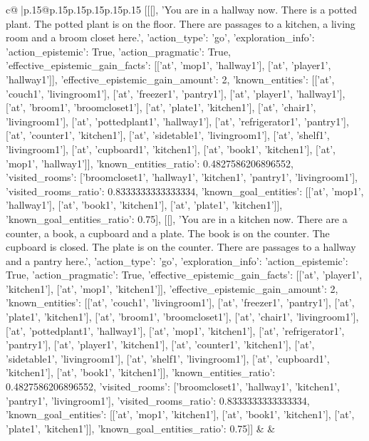 \documentclass{article}
\begin{document}
{\begin{supertabular}{c@{$\;$}|p{.15\linewidth}@{}p{.15\linewidth}p{.15\linewidth}p{.15\linewidth}p{.15\linewidth}p{.15\linewidth}}
{{{	 [[[], 'You are in a hallway now. There is a potted plant. The potted plant is on the floor. There are passages to a kitchen, a living room and a broom closet here.', {'action_type': 'go', 'exploration_info': {'action_epistemic': True, 'action_pragmatic': True, 'effective_epistemic_gain_facts': [['at', 'mop1', 'hallway1'], ['at', 'player1', 'hallway1']], 'effective_epistemic_gain_amount': 2, 'known_entities': [['at', 'couch1', 'livingroom1'], ['at', 'freezer1', 'pantry1'], ['at', 'player1', 'hallway1'], ['at', 'broom1', 'broomcloset1'], ['at', 'plate1', 'kitchen1'], ['at', 'chair1', 'livingroom1'], ['at', 'pottedplant1', 'hallway1'], ['at', 'refrigerator1', 'pantry1'], ['at', 'counter1', 'kitchen1'], ['at', 'sidetable1', 'livingroom1'], ['at', 'shelf1', 'livingroom1'], ['at', 'cupboard1', 'kitchen1'], ['at', 'book1', 'kitchen1'], ['at', 'mop1', 'hallway1']], 'known_entities_ratio': 0.4827586206896552, 'visited_rooms': ['broomcloset1', 'hallway1', 'kitchen1', 'pantry1', 'livingroom1'], 'visited_rooms_ratio': 0.8333333333333334, 'known_goal_entities': [['at', 'mop1', 'hallway1'], ['at', 'book1', 'kitchen1'], ['at', 'plate1', 'kitchen1']], 'known_goal_entities_ratio': 0.75}}], [[], 'You are in a kitchen now. There are a counter, a book, a cupboard and a plate. The book is on the counter. The cupboard is closed. The plate is on the counter. There are passages to a hallway and a pantry here.', {'action_type': 'go', 'exploration_info': {'action_epistemic': True, 'action_pragmatic': True, 'effective_epistemic_gain_facts': [['at', 'player1', 'kitchen1'], ['at', 'mop1', 'kitchen1']], 'effective_epistemic_gain_amount': 2, 'known_entities': [['at', 'couch1', 'livingroom1'], ['at', 'freezer1', 'pantry1'], ['at', 'plate1', 'kitchen1'], ['at', 'broom1', 'broomcloset1'], ['at', 'chair1', 'livingroom1'], ['at', 'pottedplant1', 'hallway1'], ['at', 'mop1', 'kitchen1'], ['at', 'refrigerator1', 'pantry1'], ['at', 'player1', 'kitchen1'], ['at', 'counter1', 'kitchen1'], ['at', 'sidetable1', 'livingroom1'], ['at', 'shelf1', 'livingroom1'], ['at', 'cupboard1', 'kitchen1'], ['at', 'book1', 'kitchen1']], 'known_entities_ratio': 0.4827586206896552, 'visited_rooms': ['broomcloset1', 'hallway1', 'kitchen1', 'pantry1', 'livingroom1'], 'visited_rooms_ratio': 0.8333333333333334, 'known_goal_entities': [['at', 'mop1', 'kitchen1'], ['at', 'book1', 'kitchen1'], ['at', 'plate1', 'kitchen1']], 'known_goal_entities_ratio': 0.75}}]] 
	  } 
	   } 
	   } 
	 & & \\ 
 

    \theutterance {}  


\end{supertabular}}
\end{document}
